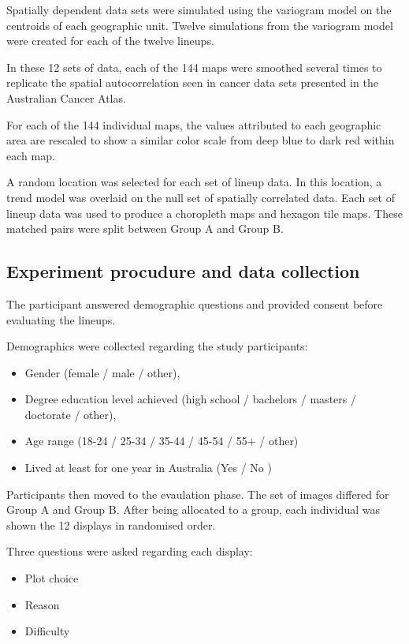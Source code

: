 \documentclass[conference,final,]{IEEEtran}
\providecommand{\tightlist}{%
  \setlength{\itemsep}{0pt}\setlength{\parskip}{0pt}}
\begin{document}
Spatially dependent data sets were simulated using the variogram model on the centroids of each geographic unit. Twelve simulations from the variogram model were created for each of the twelve lineups.

In these 12 sets of data, each of the 144 maps were smoothed several times to replicate the spatial autocorrelation seen in cancer data sets presented in the Australian Cancer Atlas.

For each of the 144 individual maps, the values attributed to each geographic area are rescaled to show a similar color scale from deep blue to dark red within each map.

A random location was selected for each set of lineup data.
In this location, a trend model was overlaid on the null set of spatially correlated data.
Each set of lineup data was used to produce a choropleth maps and hexagon tile maps. These matched pairs were split between Group A and Group B.

\hypertarget{experiment-procudure-and-data-collection}{%
\subsection{Experiment procudure and data collection}\label{experiment-procudure-and-data-collection}}

The participant answered demographic questions and provided consent before evaluating the lineups.

Demographics were collected regarding the study participants:

\begin{itemize}
\tightlist
\item
  Gender (female / male / other),
\item
  Degree education level achieved (high school / bachelors / masters / doctorate / other),
\item
  Age range (18-24 / 25-34 / 35-44 / 45-54 / 55+ / other)
\item
  Lived at least for one year in Australia (Yes / No )
\end{itemize}

Participants then moved to the evaulation phase.
The set of images differed for Group A and Group B.
After being allocated to a group, each individual was shown the 12 displays in randomised order.

Three questions were asked regarding each display:

\begin{itemize}
\tightlist
\item
  Plot choice
\item
  Reason
\item
  Difficulty
\end{itemize}
\end{document}
